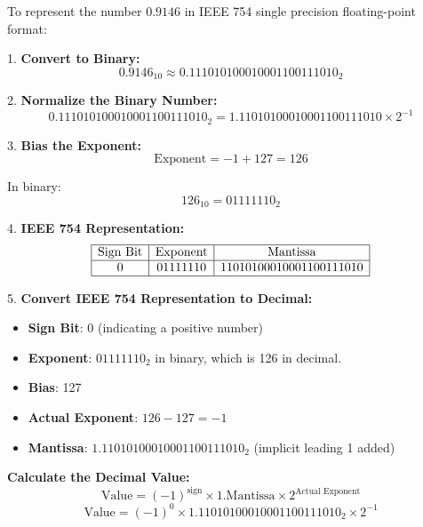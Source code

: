 \documentclass{ioereport}
\begin{document}
    
To represent the number \( 0.9146 \) in IEEE 754 single precision floating-point format:

1. \textbf{Convert to Binary:}
\[
0.9146_{10} \approx 0.111010100010001100111010_2
\]

2. \textbf{Normalize the Binary Number:}
\[
0.111010100010001100111010_2 = 1.11010100010001100111010 \times 2^{-1}
\]

3. \textbf{Bias the Exponent:}
\[
\text{Exponent} = -1 + 127 = 126
\]

In binary:
\[
126_{10} = 01111110_2
\]

4. \textbf{IEEE 754 Representation:}
\begin{equation}
    \begin{array}{|c|c|c|}
        \hline
        \text{Sign Bit} & \text{Exponent} & \text{Mantissa} \\
        \hline
        0 & 01111110 & 11010100010001100111010 \\
        \hline
    \end{array}
\end{equation}

5. \textbf{Convert IEEE 754 Representation to Decimal:}
\begin{itemize}
    \item \textbf{Sign Bit}: 0 (indicating a positive number)
    \item \textbf{Exponent}: \(01111110_2\) in binary, which is 126 in decimal.
    \item \textbf{Bias}: 127
    \item \textbf{Actual Exponent}: \(126 - 127 = -1\)
    \item \textbf{Mantissa}: \(1.11010100010001100111010_2\) (implicit leading 1 added)
\end{itemize}

\textbf{Calculate the Decimal Value:}
\[
\text{Value} = (-1)^{\text{sign}} \times 1.\text{Mantissa} \times 2^{\text{Actual Exponent}}
\]
\[
\text{Value} = (-1)^0 \times 1.11010100010001100111010_2 \times 2^{-1}
\]
\end{document}
